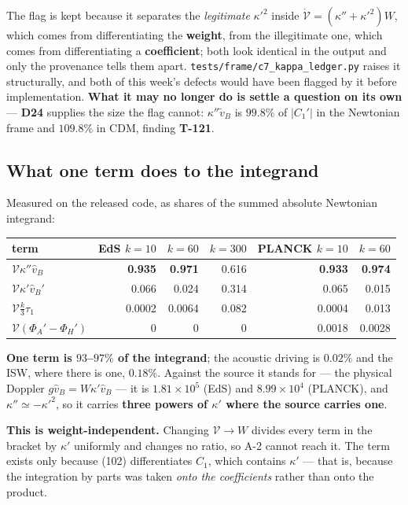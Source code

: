 The flag is kept because it separates the \emph{legitimate} $\kappa'^2$ inside
$\dot{\mathcal V}=(\kappa''+\kappa'^2)W$, which comes from differentiating the
\textbf{weight}, from the illegitimate one, which comes from differentiating a
\textbf{coefficient}; both look identical in the output and only the provenance
tells them apart. \texttt{tests/frame/c7\_kappa\_ledger.py} raises it
structurally, and both of this week's defects would have been flagged by it
before implementation. \textbf{What it may no longer do is settle a question on
its own} --- \textbf{D24} supplies the size the flag cannot:
$\kappa''\tilde v_B$ is $99.8\%$ of $|C_1'|$ in the Newtonian frame and
$109.8\%$ in CDM, finding \textbf{T-121}.

\subsection{What one term does to the integrand}
Measured on the released code, as shares of the summed absolute Newtonian
integrand:

\begin{center}\small
\begin{tabular}{lrrrrr}
\toprule
term & EdS $k{=}10$ & $k{=}60$ & $k{=}300$ & PLANCK $k{=}10$ & $k{=}60$ \\
\midrule
$\mathcal V\kappa''\hat v_B$ & \textbf{0.935} & \textbf{0.971} & 0.616 & \textbf{0.933} & \textbf{0.974} \\
$\mathcal V\kappa'\hat v_B'$ & 0.066 & 0.024 & 0.314 & 0.065 & 0.015 \\
$\mathcal V\tfrac k3\tau_1$ & 0.0002 & 0.0064 & 0.082 & 0.0004 & 0.013 \\
$\mathcal V(\Phi_A'-\Phi_H')$ & 0 & 0 & 0 & 0.0018 & 0.0028 \\
\bottomrule
\end{tabular}
\end{center}

\textbf{One term is $93$--$97\%$ of the integrand}; the acoustic driving is
$0.02\%$ and the ISW, where there is one, $0.18\%$. Against the source it
stands for --- the physical Doppler $g\hat v_B=W\kappa'\hat v_B$ --- it is
$1.81\times10^{5}$ (EdS) and $8.99\times10^{4}$ (PLANCK), and
$\kappa''\simeq-\kappa'^2$, so it carries \textbf{three powers of $\kappa'$
where the source carries one}.

\textbf{This is weight-independent.} Changing $\mathcal V\to W$ divides every
term in the bracket by $\kappa'$ uniformly and changes no ratio, so A-2
cannot reach it. The term exists only because (102) differentiates $C_1$,
which contains $\kappa'$ --- that is, because the integration by parts was
taken \emph{onto the coefficients} rather than onto the product.

